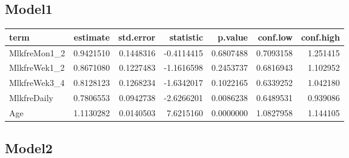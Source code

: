 \documentclass[
]{article}
\newenvironment{Shaded}{\begin{snugshade}}{\end{snugshade}}
\newcommand{\DataTypeTok}[1]{\textcolor[rgb]{0.13,0.29,0.53}{#1}}
\newcommand{\KeywordTok}[1]{\textcolor[rgb]{0.13,0.29,0.53}{\textbf{#1}}}
\newcommand{\NormalTok}[1]{#1}
\newcommand{\OperatorTok}[1]{\textcolor[rgb]{0.81,0.36,0.00}{\textbf{#1}}}
\newcommand{\OtherTok}[1]{\textcolor[rgb]{0.56,0.35,0.01}{#1}}
\newcommand{\StringTok}[1]{\textcolor[rgb]{0.31,0.60,0.02}{#1}}
\begin{document}
\hypertarget{model1-7}{%
\subsection{Model1}\label{model1-7}}

\begin{Shaded}
\end{Shaded}

\begin{longtable}[]{@{}lrrrrrr@{}}
\toprule
term & estimate & std.error & statistic & p.value & conf.low &
conf.high\tabularnewline
\midrule
\endhead
MlkfreMon1\_2 & 0.9421510 & 0.1448316 & -0.4114415 & 0.6807488 &
0.7093158 & 1.251415\tabularnewline
MlkfreWek1\_2 & 0.8671080 & 0.1227483 & -1.1616598 & 0.2453737 &
0.6816943 & 1.102952\tabularnewline
MlkfreWek3\_4 & 0.8128123 & 0.1268234 & -1.6342017 & 0.1022165 &
0.6339252 & 1.042180\tabularnewline
MlkfreDaily & 0.7806553 & 0.0942738 & -2.6266201 & 0.0086238 & 0.6489531
& 0.939086\tabularnewline
Age & 1.1130282 & 0.0140503 & 7.6215160 & 0.0000000 & 1.0827958 &
1.144105\tabularnewline
\bottomrule
\end{longtable}

\hypertarget{model2-7}{%
\subsection{Model2}\label{model2-7}}
\end{document}
